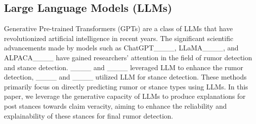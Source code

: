 \subsection{Large Language Models (LLMs)}
Generative Pre-trained Transformers (GPTs) are a class of LLMs that have revolutionized artificial intelligence in recent years. 
The significant scientific advancements made by models such as ChatGPT____, LLaMA____, and ALPACA____ have gained researchers' attention in the field of rumor detection and stance detection. ____ and ____ leveraged LLM to enhance the rumor detection, 
____ and ____ utilized LLM for stance detection.
These methods primarily focus on directly predicting rumor or stance types using LLMs. %
In this paper, %
we leverage the generative capacity of LLMs to produce explanations for post stances towards claim veracity, aiming to enhance the reliability and explainability of these stances for final rumor detection. %


